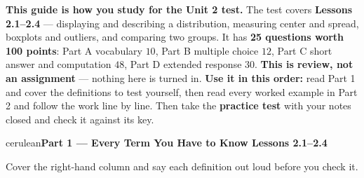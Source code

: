 \documentclass[10pt]{article}
\newcommand{\parthead}[1]{%
  \vspace{6pt}\noindent
  \begin{headlinebox}{cerulean}{\color{white}\bfseries #1}\end{headlinebox}%
  \vspace{4pt}}
\begin{document}

\vspace{0.10in}
\begin{remindbox}
\small
\textbf{This guide is how you study for the Unit 2 test.} The test covers
\textbf{Lessons 2.1--2.4} --- displaying and describing a distribution, measuring center and
spread, boxplots and outliers, and comparing two groups. It has \textbf{25 questions worth 100 points}:
Part A vocabulary $10$, Part B multiple choice $12$, Part C short answer and computation $48$,
Part D extended response $30$.
\textbf{This is review, not an assignment} --- nothing here is turned in.
\textbf{Use it in this order:} read Part 1 and cover the definitions to test yourself, then
read every worked example in Part 2 and follow the work line by line. Then take the
\textbf{practice test} with your notes closed and check it against its key.
\end{remindbox}

\parthead{Part 1 --- Every Term You Have to Know \hfill Lessons 2.1--2.4}

\small
Cover the right-hand column and say each definition out loud before you check it.
\end{document}
